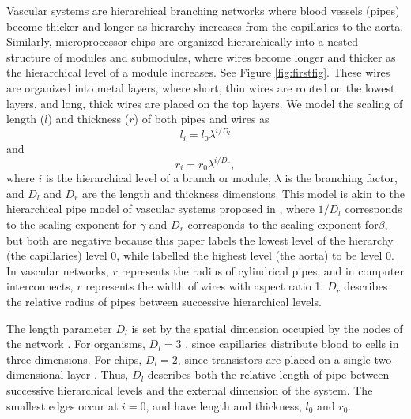 \documentclass[12pt]{article}
\begin{document}
Vascular systems are hierarchical branching networks where blood 
vessels (pipes) become thicker and longer as hierarchy increases from 
the capillaries to the aorta. Similarly, microprocessor chips are 
organized hierarchically into a nested structure of modules and 
submodules, where wires become longer and thicker as the hierarchical 
level of a module increases.  See Figure \ref{fig:firstfig}.  These wires are organized into metal 
layers, where short, thin wires are routed on the lowest layers, and 
long, thick wires are placed on the top layers. We model the scaling 
of length ($l$) and thickness ($r$) of both pipes and wires as
\begin{equation}
l_i = l_0 \lambda^{i/D_l}
\end{equation}
and
\begin{equation}
r_i = r_0 \lambda^{i/D_r},
\end{equation}
where $i$ is the hierarchical level of a branch or module, $\lambda$ 
is the branching factor, and $D_l$ and $D_r$ are the length and 
thickness dimensions.  This model is akin to the hierarchical pipe 
model of vascular systems proposed in \cite{west97}, where $1/D_l$ 
corresponds to the scaling exponent for $\gamma$ and $D_r$ corresponds to the scaling exponent for$\beta$, but both are negative because
this paper labels the lowest level of the hierarchy (the capillaries) level 0, while  \cite{west97} labelled the highest level (the aorta) to be level 0. In vascular 
networks, $r$ represents the radius of cylindrical pipes, and in 
computer interconnects, $r$ represents the width of wires with aspect 
ratio 1.  $D_r$ describes the relative radius of pipes between successive hierarchical levels. 

The length parameter $D_l$ is set by the spatial dimension occupied 
by the nodes of the network \cite{mandelbrot83}.
For organisms, $D_l = 3$ 
\cite{west97, banavar10}, since capillaries distribute blood to cells in three 
dimensions.  For chips, $D_l = 2$, since transistors are placed on a 
single two-dimensional layer \cite{donath81, moses08}.
Thus, $D_l$ describes both the relative length of pipe between successive hierarchical levels and the external dimension of the system.
The smallest edges occur at $i = 0$, and have 
length and thickness, $l_0$ and $r_0$. 
\end{document}
